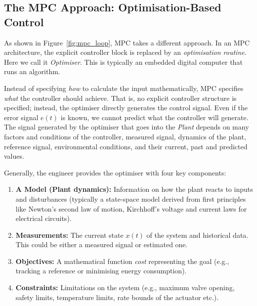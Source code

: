 \subsection{The MPC Approach: Optimisation-Based Control}
As shown in Figure~\ref{fig:mpc_loop}, MPC takes a different approach. In an MPC architecture, the explicit controller block is replaced by an \emph{optimisation routine}. Here we call it \emph{Optimiser}. This is typically an embedded digital computer that runs an algorithm.  

Instead of specifying \emph{how} to calculate the input mathematically, MPC specifies \emph{what} the controller should achieve. That is, no explicit controller structure is specified; instead, the optimiser directly generates the control signal. Even if the error signal $e(t)$ is known, we cannot predict what the controller will generate. The signal generated by the optimiser that goes into the \emph{Plant} depends on many factors and conditions of the controller,  measured signal,  dynamics of the plant, reference signal, environmental conditions, and their current, past and predicted values. 

Generally, the engineer provides the optimiser with four key components:
\begin{enumerate}
	\item \textbf{A Model (Plant dynamics):} Information on how the plant reacts to inputs and disturbances (typically a state-space model derived from first principles like Newton's second law of motion, Kirchhoff's voltage and current laws for electrical circuits).
	\item \textbf{Measurements:} The current state $x(t)$ of the system and historical data. This could be either a measured signal or estimated one.
	\item \textbf{Objectives:} A mathematical function  \emph{cost} representing the goal (e.g., tracking a reference or minimising energy consumption).
	\item \textbf{Constraints:} Limitations on the system (e.g., maximum valve opening, safety limits, temperature limits, rate bounds of the actuator etc.).
\end{enumerate}


